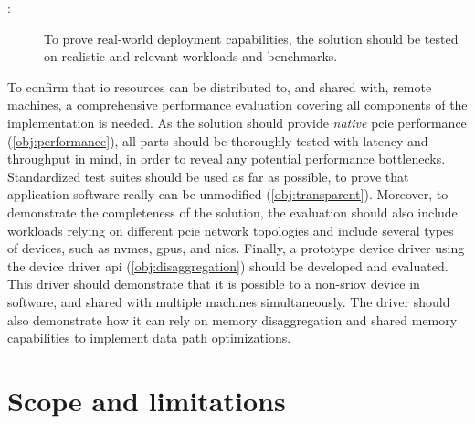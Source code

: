 \begin{description}    
    \item[:] To prove real-world deployment capabilities, the solution should be tested on realistic and relevant workloads and benchmarks.
\end{description}
To confirm that \gls{io} resources can be distributed to, and shared with, remote machines, a comprehensive performance evaluation covering all components of the implementation is needed.
As the solution should provide \emph{native} \gls{pcie} performance (\cref{obj:performance}), all parts should be thoroughly tested with latency and throughput in mind, in order to reveal any potential performance bottlenecks.
Standardized test suites should be used as far as possible, to prove that application software really can be unmodified (\cref{obj:transparent}).
%
Moreover, to demonstrate the completeness of the solution, the evaluation should also include workloads relying on different \gls{pcie} network topologies and include several types of devices, such as \glspl{nvme}, \glspl{gpu}, and \glspl{nic}.
%
Finally, a prototype device driver using the device driver \gls{api} (\cref{obj:disaggregation}) should be developed and evaluated. This driver should demonstrate that it is possible to  a non-\gls{sriov} device in software, and shared with multiple machines simultaneously. The driver should also demonstrate how it can rely on memory \gls{disaggregation} and shared memory capabilities to implement data path optimizations.



\section{Scope and limitations}




